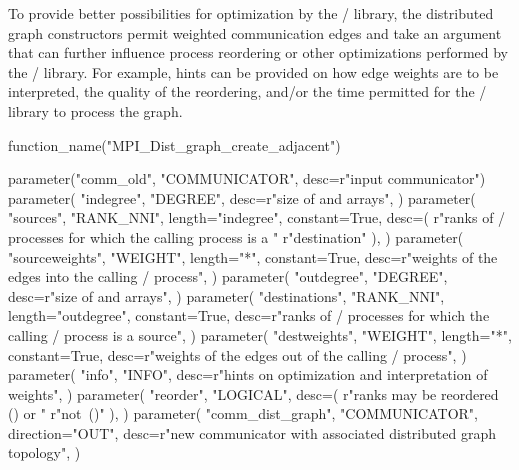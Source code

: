 To provide better possibilities for optimization by the \MPI/ library,
the distributed graph constructors permit weighted communication edges
and take an  argument that can further influence process
reordering or other optimizations performed by the \MPI/ library. For
example, hints can be provided on how edge weights are to be
interpreted, the quality of the reordering, and/or the time permitted
for the \MPI/ library to process the graph.

\begin{mpi-binding}
    function_name("MPI_Dist_graph_create_adjacent")
    
    parameter("comm_old", "COMMUNICATOR", desc=r"input communicator")
    parameter(
        "indegree",
        "DEGREE",
        desc=r"size of  and  arrays",
    )
    parameter(
        "sources",
        "RANK_NNI",
        length="indegree",
        constant=True,
        desc=(
            r"ranks of \MPI/ processes for which the calling process is a "
            r"destination"
        ),
    )
    parameter(
        "sourceweights",
        "WEIGHT",
        length="*",
        constant=True,
        desc=r"weights of the edges into the calling \MPI/ process",
    )
    parameter(
        "outdegree",
        "DEGREE",
        desc=r"size of  and  arrays",
    )
    parameter(
        "destinations",
        "RANK_NNI",
        length="outdegree",
        constant=True,
        desc=r"ranks of \MPI/ processes for which the calling \MPI/ process is a source",
    )
    parameter(
        "destweights",
        "WEIGHT",
        length="*",
        constant=True,
        desc=r"weights of the edges out of the calling \MPI/ process",
    )
    parameter(
        "info",
        "INFO",
        desc=r"hints on optimization and interpretation of weights",
    )
    parameter(
        "reorder",
        "LOGICAL",
        desc=(
            r"ranks may be reordered () or "
            r"not~(\mbox{})"
        ),
    )
    parameter(
        "comm_dist_graph",
        "COMMUNICATOR",
        direction="OUT",
        desc=r"new communicator with associated distributed graph topology",
    )
\end{mpi-binding}

